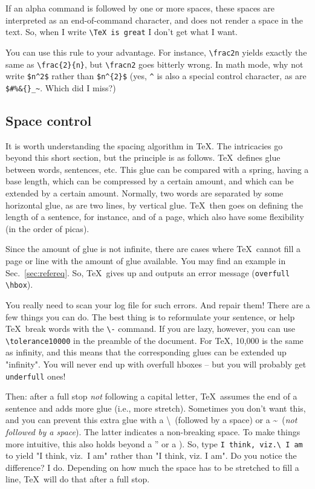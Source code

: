\documentclass{article}
\begin{document}
If an alpha command is followed by one or more spaces, these spaces are interpreted as an end-of-command character, and does not render a space in the text.  So, when I write \verb+\TeX is great+ I don't get what I want.

You can use this rule to your advantage.  For instance, \verb+\frac2n+ yields exactly the same as \verb+\frac{2}{n}+, but \verb+\fracn2+ goes bitterly wrong.  In math mode, why not write \verb+$n^2$+ rather than \verb+$n^{2}$+ (yes, \verb+^+ is also a special control character, as are \verb+$#%&{}_~+.  Which did I miss?)
 
\subsection{Space control}
It is worth understanding the spacing algorithm in \TeX. The intricacies go beyond this short section, but the principle is as follows.  \TeX\ defines glue between words, sentences, etc.  This glue can be compared with a spring, having a base length, which can be compressed by a certain amount, and which can be extended by a certain amount.  Normally, two words are separated by some  horizontal glue, as are two lines, by vertical glue.  \TeX\ then goes on defining the length of a sentence, for instance, and of a page, which also have some flexibility (in the order of picas).

Since the amount of glue is not infinite, there are cases where \TeX\ cannot fill a page or line with the amount of glue available.  You may find an example in Sec.~\ref{sec:refereq}.  So, \TeX\ gives up and outputs an error message (\verb+overfull \hbox+).

You really need to scan your log file for such errors.  And repair them!  There are a few things you can do.  The best thing is to reformulate your sentence, or help \TeX\ break words with the \verb+\-+ command.  If you are lazy, however, you can use \verb+\tolerance10000+ in the preamble of the document.  For \TeX, 10,000 is the same as infinity, and this means that the corresponding glues can be extended up "infinity".  You will never end up with overfull hboxes -- but you will probably get \verb+underfull+ ones!

Then: after a full stop \textsl{not} following a capital letter, \TeX\ assumes the end of a sentence and adds more glue (i.e., more stretch).  Sometimes you don't want this, and you can prevent this extra glue with a \textbackslash\ (followed by a space) or a \textasciitilde\ (\textsl{not followed by a space}). The latter indicates a non-breaking space. To make things more intuitive, this also holds beyond a '' or a ).  So, type \verb+I think, viz.\ I am+ to yield "I think, viz.\ I am" rather than "I think, viz. I am". Do you notice the difference?  I do.  Depending on how much the space has to be stretched to fill a line, \TeX\ will do that after a full stop.
\end{document}
